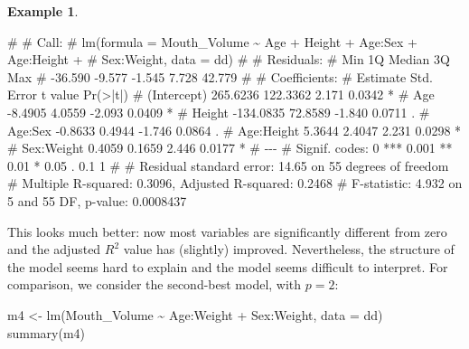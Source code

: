 \documentclass[
  a4paper,
]{article}
\newenvironment{Shaded}{\begin{snugshade}}{\end{snugshade}}
\newcommand{\AttributeTok}[1]{\textcolor[rgb]{0.77,0.63,0.00}{#1}}
\newcommand{\FunctionTok}[1]{\textcolor[rgb]{0.00,0.00,0.00}{#1}}
\newcommand{\NormalTok}[1]{#1}
\newcommand{\OtherTok}[1]{\textcolor[rgb]{0.56,0.35,0.01}{#1}}
\newcommand{\SpecialCharTok}[1]{\textcolor[rgb]{0.00,0.00,0.00}{#1}}
\theoremstyle{definition}
\theoremstyle{definition}
\newtheorem{example}{Example}[section]
\theoremstyle{definition}
\theoremstyle{definition}
\theoremstyle{remark}
\begin{document}
\begin{example}
\begin{Shaded}
\begin{Highlighting}[]
\NormalTok{\# }
\NormalTok{\# Call:}
\NormalTok{\# lm(formula = Mouth\_Volume \textasciitilde{} Age + Height + Age:Sex + Age:Height + }
\NormalTok{\#     Sex:Weight, data = dd)}
\NormalTok{\# }
\NormalTok{\# Residuals:}
\NormalTok{\#     Min      1Q  Median      3Q     Max }
\NormalTok{\# {-}36.590  {-}9.577  {-}1.545   7.728  42.779 }
\NormalTok{\# }
\NormalTok{\# Coefficients:}
\NormalTok{\#              Estimate Std. Error t value Pr(\textgreater{}|t|)  }
\NormalTok{\# (Intercept)  265.6236   122.3362   2.171   0.0342 *}
\NormalTok{\# Age           {-}8.4905     4.0559  {-}2.093   0.0409 *}
\NormalTok{\# Height      {-}134.0835    72.8589  {-}1.840   0.0711 .}
\NormalTok{\# Age:Sex       {-}0.8633     0.4944  {-}1.746   0.0864 .}
\NormalTok{\# Age:Height     5.3644     2.4047   2.231   0.0298 *}
\NormalTok{\# Sex:Weight     0.4059     0.1659   2.446   0.0177 *}
\NormalTok{\# {-}{-}{-}}
\NormalTok{\# Signif. codes:  0 \textquotesingle{}***\textquotesingle{} 0.001 \textquotesingle{}**\textquotesingle{} 0.01 \textquotesingle{}*\textquotesingle{} 0.05 \textquotesingle{}.\textquotesingle{} 0.1 \textquotesingle{} \textquotesingle{} 1}
\NormalTok{\# }
\NormalTok{\# Residual standard error: 14.65 on 55 degrees of freedom}
\NormalTok{\# Multiple R{-}squared:  0.3096,  Adjusted R{-}squared:  0.2468 }
\NormalTok{\# F{-}statistic: 4.932 on 5 and 55 DF,  p{-}value: 0.0008437}
\end{Highlighting}
\end{Shaded}

This looks much better: now most variables are significantly different from
zero and the adjusted \(R^2\) value has (slightly) improved. Nevertheless,
the structure of the model seems hard to explain and the model seems
difficult to interpret. For comparison, we consider the second-best
model, with \(p=2\):

\begin{Shaded}
\begin{Highlighting}[]
\NormalTok{m4 }\OtherTok{\textless{}{-}} \FunctionTok{lm}\NormalTok{(Mouth\_Volume }\SpecialCharTok{\textasciitilde{}}\NormalTok{ Age}\SpecialCharTok{:}\NormalTok{Weight }\SpecialCharTok{+}\NormalTok{ Sex}\SpecialCharTok{:}\NormalTok{Weight, }\AttributeTok{data =}\NormalTok{ dd)}
\FunctionTok{summary}\NormalTok{(m4)}
\end{Highlighting}
\end{Shaded}


\end{example}
\end{document}
